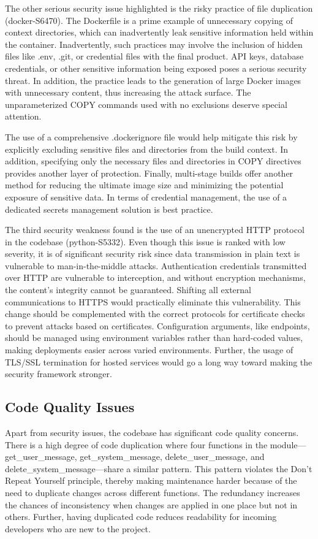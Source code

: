 \documentclass[sigconf]{acmart}
\begin{document}
The other serious security issue highlighted is the risky practice of file duplication (docker-S6470). The Dockerfile is a prime example of unnecessary copying of context directories, which can inadvertently leak sensitive information held within the container. Inadvertently, such practices may involve the inclusion of hidden files like .env, .git, or credential files with the final product. API keys, database credentials, or other sensitive information being exposed poses a serious security threat. In addition, the practice leads to the generation of large Docker images with unnecessary content, thus increasing the attack surface. The unparameterized COPY commands used with no exclusions deserve special attention.

The use of a comprehensive .dockerignore file would help mitigate this risk by explicitly excluding sensitive files and directories from the build context. In addition, specifying only the necessary files and directories in COPY directives provides another layer of protection. Finally, multi-stage builds offer another method for reducing the ultimate image size and minimizing the potential exposure of sensitive data. In terms of credential management, the use of a dedicated secrets management solution is best practice.

The third security weakness found is the use of an unencrypted HTTP protocol in the codebase (python-S5332). Even though this issue is ranked with low severity, it is of significant security risk since data transmission in plain text is vulnerable to man-in-the-middle attacks. Authentication credentials transmitted over HTTP are vulnerable to interception, and without encryption mechanisms, the content's integrity cannot be guaranteed. Shifting all external communications to HTTPS would practically eliminate this vulnerability. This change should be complemented with the correct protocols for certificate checks to prevent attacks based on certificates. Configuration arguments, like endpoints, should be managed using environment variables rather than hard-coded values, making deployments easier across varied environments. Further, the usage of TLS/SSL termination for hosted services would go a long way toward making the security framework stronger.

\subsection{Code Quality Issues}
Apart from security issues, the codebase has significant code quality concerns. There is a high degree of code duplication where four functions in the module—get\_user\_message, get\_system\_message, delete\_user\_message, and delete\_system\_message—share a similar pattern. This pattern violates the Don't Repeat Yourself principle, thereby making maintenance harder because of the need to duplicate changes across different functions. The redundancy increases the chances of inconsistency when changes are applied in one place but not in others. Further, having duplicated code reduces readability for incoming developers who are new to the project.
\end{document}
